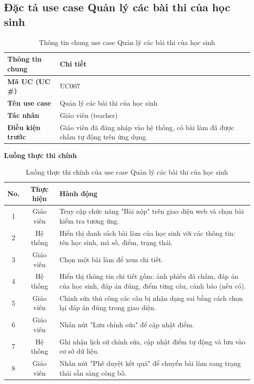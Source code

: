 ﻿\documentclass[../DoAn.tex]{subfiles}
\begin{document}
\subsection{Đặc tả use case Quản lý các bài thi của học sinh}
\label{subsection:appendix:B.3}
\begin{table}[H]
\centering
\begin{tabular}{|p{4cm}|p{10cm}|}
\hline
\textbf{Thông tin chung} & \textbf{Chi tiết} \\ \hline
\textbf{Mã UC (UC \#)} & UC007 \\ \hline
\textbf{Tên use case} & Quản lý các bài thi của học sinh \\ \hline
\textbf{Tác nhân} & Giáo viên (teacher) \\ \hline
\textbf{Điều kiện trước} & Giáo viên đã đăng nhập vào hệ thống, có bài làm đã được chấm tự động trên ứng dụng. \\ \hline
\end{tabular}
\caption{Thông tin chung use case Quản lý các bài thi của học sinh}
\label{table:appendix:B.3_info}
\end{table}
\noindent\textbf{Luồng thực thi chính}
\begin{table}[H]
\centering
\begin{tabular}{|c|c|p{9cm}|}
\hline
\textbf{No.} & \textbf{Thực hiện} & \textbf{Hành động} \\ \hline
1 & Giáo viên & Truy cập chức năng "Bài nộp" trên giao diện web và chọn bài kiểm tra tương ứng. \\ \hline
2 & Hệ thống & Hiển thị danh sách bài làm của học sinh với các thông tin: tên học sinh, mã số, điểm, trạng thái. \\ \hline
3 & Giáo viên & Chọn một bài làm để xem chi tiết. \\ \hline
4 & Hệ thống & Hiển thị thông tin chi tiết gồm: ảnh phiếu đã chấm, đáp án của học sinh, đáp án đúng, điểm từng câu, cảnh báo (nếu có). \\ \hline
5 & Giáo viên & Chỉnh sửa thủ công các câu bị nhận dạng sai bằng cách chọn lại đáp án đúng trong giao diện. \\ \hline
6 & Giáo viên & Nhấn nút "Lưu chỉnh sửa" để cập nhật điểm. \\ \hline
7 & Hệ thống & Ghi nhận lịch sử chỉnh sửa, cập nhật điểm tự động và lưu vào cơ sở dữ liệu. \\ \hline
8 & Giáo viên & Nhấn nút "Phê duyệt kết quả" để chuyển bài làm sang trạng thái sẵn sàng công bố. \\ \hline
\end{tabular}
\caption{Luồng thực thi chính của use case Quản lý các bài thi của học sinh}
\label{table:appendix:B.3_main}
\end{table}
\end{document}
